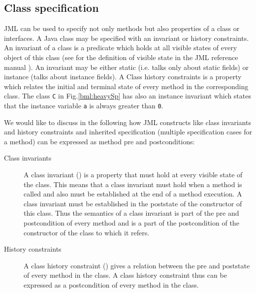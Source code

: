 \subsection{Class specification} \label{javaVerif:JML:classSpec}
JML can be used to specify not only methods but also properties of a class or interfaces. 
A Java class may be specified with an invariant or history constraints. An invariant of a class is a predicate which holds at all visible states of
  every object of this class (see for the definition of visible state in the JML reference manual \cite{december-jml}). An invariant may be either static 
 (i.e. talks only about static fields) or instance (talks about instance fields).
  A Class history constraints is a property which relates the initial and terminal state of every method in the corresponding class. 
 The class \texttt{C}  in Fig.\ref{bml:heavySp} has also an instance invariant which states that the instance variable \texttt{a} is
 always greater than \texttt{0}.





We would like to discuss in the following how JML constructs like class invariants and history constraints and inherited specification
(multiple specification cases for a method) can be expressed as 
method pre and postconditions:

\begin{description} 
  \item [Class invariants] A class invariant (\ClassInv)  is a property that must hold at every visible state of the class. This means that a
        class invariant must hold when a method is called and also must be established at the end of a method execution. 
	A class invariant must be established in the poststate 
	of the constructor of this class.
	Thus the semantics of
	a class invariant is part of the pre and  postcondition of every method and is a part of the postcondition of the constructor of
	the class to which it refers.
	
        
  \item [History constraints] A class history constraint (\ClassHistoryConstr) gives a relation between the pre and poststate of every method in the class. 
        A class history constraint thus can be expressed as a postcondition of every method in the class.
  
\end{description}     

